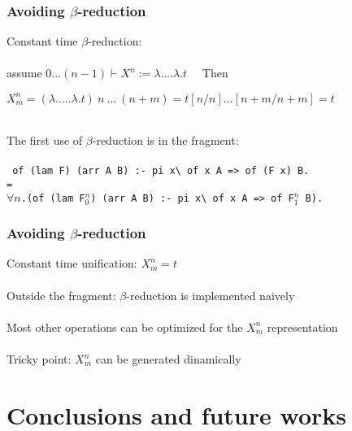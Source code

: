 \documentclass{beamer}
\newcommand{\bs}{\textbackslash\,}
\begin{document}
\begin{frame}
 \frametitle{Avoiding $\beta$-reduction}

 Constant time $\beta$-reduction:\\~\\

 assume $0 \ldots (n-1)\vdash X^n := \lambda. \ldots \lambda. t\quad$ Then\\

 \begin{center}
 $X^n_m = (\lambda. \ldots. \lambda. t)~n~\ldots~(n+m)
 = t[n/n]\ldots[n+m/n+m] = t$
 \end{center}

~\\

The first use of $\beta$-reduction is in the fragment:\\~\\

{\small
\texttt{
\hspace{-0.2cm}
of (lam F) (arr A B) :- pi x\bs of x A => of (F x) B.\\
\hspace{5cm}=\\
\hspace{-0.75cm}
\alert{$\forall n$.}(of (lam \alert{F$^n_0$}) (arr A B) :- pi x\bs of x A => of \alert{F$^n_1$} B).
}}
\end{frame}

\begin{frame}
 \frametitle{Avoiding $\beta$-reduction}

 \alert{Constant time unification}: $X^n_m = t$\\~\\

 Outside the fragment: $\beta$-reduction is implemented \alert{naively}\\~\\

 Most other operations can be \alert{optimized} for the $X^n_m$ representation\\~\\

 Tricky point: $X^n_m$ can be generated dinamically
\end{frame}

\section{Conclusions and future works}
\end{document}
